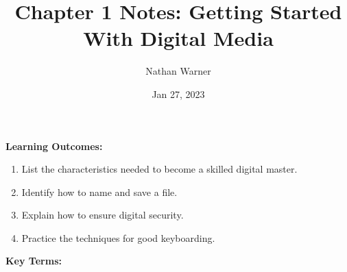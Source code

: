 \documentclass{report}
\title{\Huge{Chapter 1 Notes: Getting Started With Digital Media}}
\author{\huge{Nathan Warner}}
\date{\huge{Jan 27, 2023}}
\begin{document}
    \maketitle
    \begin{Large}
        \noindent \textbf{Learning Outcomes:}
    \end{Large}

    \bigbreak \noindent 
    \begin{enumerate}
        \item List the characteristics needed to become a skilled digital master.
        \item Identify how to name and save a file.
        \item Explain how to ensure digital security. 
        \item Practice the techniques for good keyboarding.
    \end{enumerate}

    \bigbreak \noindent \bigbreak \noindent \bigbreak \noindent 
    \begin{Large}
        \textbf{Key Terms:}
    \end{Large}
\end{document}
